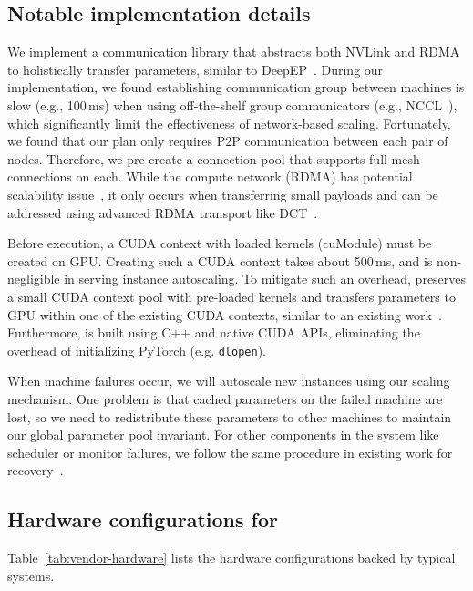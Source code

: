 \subsection{Notable implementation details}
\label{sec:appendix-implementation}


We implement a communication library
that abstracts both NVLink and RDMA to holistically transfer parameters,
similar to DeepEP~\cite{deepep}.
During our implementation, we found 
establishing communication group between machines is slow (e.g., 100\,ms) 
when using off-the-shelf group communicators (e.g., NCCL~\cite{nccl}),
which significantly limit the effectiveness of network-based scaling.
Fortunately, we found that our plan only requires P2P communication between each pair of nodes. 
Therefore, we pre-create a connection pool that supports full-mesh connections on each.
While the compute network (RDMA) has potential scalability issue~\cite{fasst}, 
it only occurs when transferring small payloads and can be addressed using advanced RDMA 
transport like DCT~\cite{krcore}. 

Before execution, a CUDA context with loaded kernels (cuModule) must be created on GPU.
Creating such a CUDA context takes about 500\,ms, and is non-negligible in serving instance
autoscaling. To mitigate such an overhead, {\sys} preserves a small CUDA context pool with
pre-loaded kernels and transfers parameters to GPU within one of the existing CUDA contexts,
similar to an existing work~\cite{DBLP:journals/corr/abs-2405-12079}.
Furthermore, {\sys} is built using C++ and native CUDA APIs, eliminating the overhead of initializing
PyTorch (e.g. \texttt{dlopen}).

When machine failures occur, 
we will autoscale new instances using our scaling mechanism. 
One problem is that cached parameters on the failed machine are lost, 
so we need to redistribute these parameters to other machines to maintain 
our global parameter pool invariant. 
For other components in the system like 
scheduler or monitor failures, we follow the same procedure
in existing work for recovery~\cite{DBLP:conf/usenix/Romero0YK21,DBLP:journals/corr/abs-2401-14351}. 



\subsection{Hardware configurations for {\maas}}
\label{sec:appendix-hardware}

\noindent
Table~\ref{tab:vendor-hardware} lists the hardware configurations backed by typical 
{\maas} systems. 